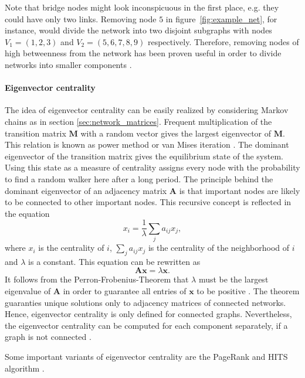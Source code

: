 Note that bridge nodes might look inconspicuous in the first place, e.g. they could have only two links.
Removing node $5$ in figure~\ref{fig:example_net}, for instance, would divide the network into two disjoint subgraphs with nodes $V_1=(1,2,3)$ and $V_2=(5,6,7,8,9)$ respectively.
Therefore, removing nodes of high betweenness from the network has been proven useful in order to divide networks into smaller components \citep{girvan2002,Newman:2004}.


\paragraph{Eigenvector centrality\color{Cayenne}{.}}
The idea of eigenvector centrality can be easily realized by considering Markov chains as in section \ref{sec:network_matrices}.
Frequent multiplication of the transition matrix $\mathbf{M}$ with a random vector gives the largest eigenvector of $\mathbf{M}$.
This relation is known as power method or van Mises iteration \citep{van_mises}.
The dominant eigenvector of the transition matrix gives the equilibrium state of the system.
Using this state as a measure of centrality assigns every node with the probability to find a random walker here after a long period.
The principle behind the dominant eigenvector of an adjacency matrix $\mathbf{A}$ is that important nodes are likely to be connected to other important nodes.
This recursive concept is reflected in the equation
\[
x_i =\frac{1}{\lambda } \sum _j a_{ij} x_j ,
\]
where $x_i$ is the centrality of $i$, $\sum _j a_{ij} x_j$ is the centrality of the neighborhood of $i$ and $\lambda $ is a constant.
This equation can be rewritten as
\begin{equation}
\mathbf{Ax}=\lambda \mathbf{x}.
\end{equation}
It follows from the Perron-Frobenius-Theorem that $\lambda $ must be the largest eigenvalue of $\mathbf{A}$ in order to guarantee all entries of $\mathbf{x}$ to be positive \citep{Bonacich:1972,Bonacich:2007}.
The theorem guaranties unique solutions only to adjacency matrices of connected networks.
Hence, eigenvector centrality is only defined for connected graphs.
Nevertheless, the eigenvector centrality can be computed for each component separately, if a graph is not connected \citep{Bonacich:2007}.

Some important variants of eigenvector centrality are the PageRank and HITS algorithm \citep{Kleinberg:1999,PageRank:}.

